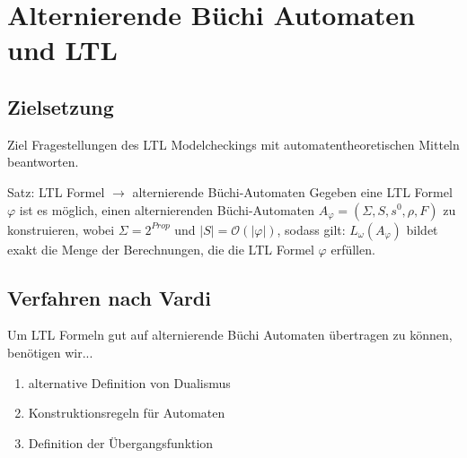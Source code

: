 \section{Alternierende Büchi Automaten und LTL}

\subsection{Zielsetzung}
\begin{frame}{\insertsubsection}
\begin{block}{Ziel}
    Fragestellungen des LTL Modelcheckings mit automatentheoretischen Mitteln beantworten.
\end{block}
\pause
\vspace*{1.5em}
\begin{block}{Satz: LTL Formel $\rightarrow$ alternierende Büchi-Automaten \cite{vardi+96}}
    Gegeben eine LTL Formel $\varphi$ ist es möglich, einen alternierenden Büchi-Automaten $A_\varphi = (\Sigma, S, s^0, \rho, F)$ zu konstruieren, wobei $\Sigma = 2^{Prop}$ und $|S| = \mathcal{O}(|\varphi|)$, sodass gilt: $L_\omega(A_\varphi)$ bildet exakt die Menge der Berechnungen, die die LTL Formel $\varphi$ erfüllen.
\end{block}
\end{frame}

\subsection{Verfahren nach Vardi \cite{vardi+96}}
\begin{frame}{\insertsubsection}
Um LTL Formeln gut auf alternierende Büchi Automaten übertragen zu können, benötigen wir...
\vspace*{1em}
\begin{enumerate}[<+->]
    \setlength\itemsep{1.5em}
    \item alternative Definition von Dualismus
    \item Konstruktionsregeln für Automaten
    \item Definition der Übergangsfunktion
\end{enumerate}
\end{frame}

